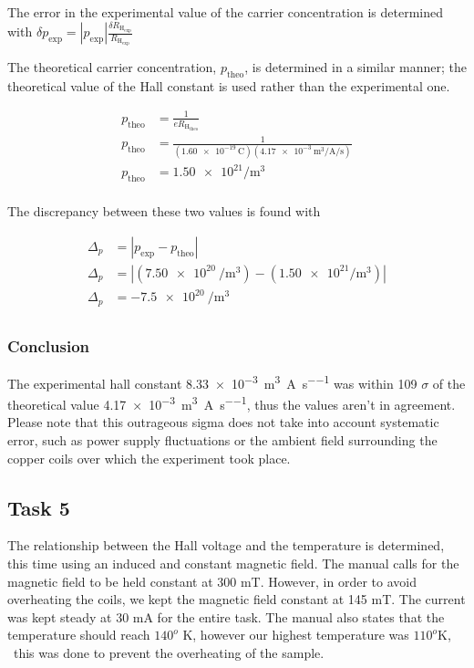 \documentclass[a4paper]{article}
\begin{document}
The error in the experimental value of the carrier concentration is determined
with \( \delta p_{\text{exp}} = | p_{\text{exp}} | \frac{\delta
  R_{\text{H}_{\text{exp}}}}{R_{\text{H}_{\text{exp}}}} \)

\qq The theoretical carrier concentration, \( p_{\text{theo}} \), is determined in a
similar manner; the theoretical value of the Hall constant is used rather than
the experimental one.

\begin{align*}
  p_{\text{theo}} &= \frac{1}{\si{\elementarycharge} R_{\text{H}_{\text{theo}}}}
  \\
  p_{\text{theo}} &= \frac{1}{(\SI{1.60e-19}{\coulomb})
                    (\SI{4.17e-3}{\cubic\meter\per\ampere\per\second})} \\
  p_{\text{theo}} &= \num{1.50e21} \si{\per\cubic\meter} \\
\end{align*}

The discrepancy between these two values is found with

\begin{align*}
  \Delta_p &= | p_{\text{exp}} - p_{\text{theo}} | \\
  \Delta_p &= | (\SI{7.50e20}{\per\cubic\meter}) - (\num{1.50e21}
             \si{\per\cubic\meter}) | \\
  \Delta_p &= \SI{-7.5e20}{\per\cubic\meter} \\
\end{align*}


\subsubsection{Conclusion}
\qq The experimental hall constant
\SI{8.33e-3}{\cubic\meter\per\ampere\per\second} was within 109 $\sigma$ of the 
theoretical value \SI{4.17e-3}{\cubic\meter\per\ampere\per\second}, thus the
values aren't in agreement. Please note that this outrageous sigma does not take
into account systematic error, such as power supply fluctuations or the ambient
field surrounding the copper coils over which the experiment took place. 

\subsection{Task 5}

\qq The relationship between the Hall voltage and the temperature is
determined, this time using an induced and constant magnetic
field. The manual calls for the magnetic field to be held constant at
300 mT. However, in order to avoid overheating the coils, we kept the
magnetic field constant at 145 mT. The current was kept steady at 30
mA for the entire task. The manual also states that the temperature
should reach $140^o$ K, however our highest temperature was $110^o$K, \
this was done to prevent the overheating of the sample.
\end{document}
